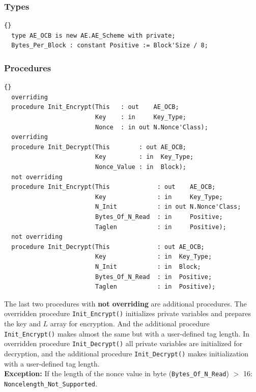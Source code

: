 \subsubsection*{Types}
\begin{lstlisting}{}
  type AE_OCB is new AE.AE_Scheme with private;
  Bytes_Per_Block : constant Positive := Block'Size / 8;
\end{lstlisting}
\subsubsection*{Procedures}
\begin{lstlisting}{}
  overriding
  procedure Init_Encrypt(This   : out    AE_OCB;
                         Key    : in     Key_Type;
                         Nonce  : in out N.Nonce'Class);
  overriding
  procedure Init_Decrypt(This        : out AE_OCB;
                         Key         : in  Key_Type;
                         Nonce_Value : in  Block);
  not overriding
  procedure Init_Encrypt(This             : out    AE_OCB;
                         Key              : in     Key_Type;
                         N_Init           : in out N.Nonce'Class;
                         Bytes_Of_N_Read  : in     Positive;
                         Taglen           : in     Positive);
  not overriding
  procedure Init_Decrypt(This             : out AE_OCB;
                         Key              : in  Key_Type;
                         N_Init           : in  Block;
                         Bytes_Of_N_Read  : in  Positive;
                         Taglen           : in  Positive);
\end{lstlisting}
The last two procedures with \textbf{not overriding} are additional
procedures. The overridden procedure \texttt{Init\_Encrypt()}
initializes private variables and prepares the key and $L$ array for
encryption. And the additional procedure \texttt{Init\_Encrypt()}
makes almost the same but with a user-defined tag length. In
overridden procedure \texttt{Init\_Decrypt()} all private variables
are initialized for decryption, and the additional procedure
\texttt{Init\_Decrypt()} makes initialization with a user-defined tag
length.\\

\noindent\textbf{Exception:} If the length of the nonce value in byte
(\texttt{Bytes\_Of\_N\_Read}) $>$ 16:
\texttt{Noncelength\-\_Not\_Supported}.


